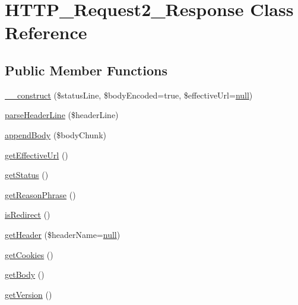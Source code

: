 \hypertarget{classHTTP__Request2__Response}{}\section{H\+T\+T\+P\+\_\+\+Request2\+\_\+\+Response Class Reference}
\label{classHTTP__Request2__Response}
\subsection*{Public Member Functions}
\begin{DoxyCompactItemize}
\item 
\hyperlink{classHTTP__Request2__Response_aaaa2f628e7dbfecfeb775c9ee6c12bdb}{\+\_\+\+\_\+construct} (\$status\+Line, \$body\+Encoded=true, \$effective\+Url=\hyperlink{modernizr_8min_8js_a286f9ec831c5e676eeb493248eab9575}{null})
\item 
\hyperlink{classHTTP__Request2__Response_a04cced85d4e024e5f41bb326aeba4bb8}{parse\+Header\+Line} (\$header\+Line)
\item 
\hyperlink{classHTTP__Request2__Response_a9c058efa93fa093f9e2ea3899aaafd81}{append\+Body} (\$body\+Chunk)
\item 
\hyperlink{classHTTP__Request2__Response_ac62d21f48b31db496403da74ec9a9635}{get\+Effective\+Url} ()
\item 
\hyperlink{classHTTP__Request2__Response_a624920600f1cff1d72493c74e945ace3}{get\+Status} ()
\item 
\hyperlink{classHTTP__Request2__Response_aabc673a3430ee9b8ad0e29275b31c655}{get\+Reason\+Phrase} ()
\item 
\hyperlink{classHTTP__Request2__Response_a9f99e1beb096712a7b1ebda78b638b06}{is\+Redirect} ()
\item 
\hyperlink{classHTTP__Request2__Response_a4fcafd1538662af1415ccf12cae68c62}{get\+Header} (\$header\+Name=\hyperlink{modernizr_8min_8js_a286f9ec831c5e676eeb493248eab9575}{null})
\item 
\hyperlink{classHTTP__Request2__Response_a1c8c23d204f797dd18a31aa5a9c50414}{get\+Cookies} ()
\item 
\hyperlink{classHTTP__Request2__Response_a2aa534b9ea2994761e3b9260908ad678}{get\+Body} ()
\item 
\hyperlink{classHTTP__Request2__Response_acf2961ff04baa2610df8ca30ea5313b0}{get\+Version} ()
\end{DoxyCompactItemize}
